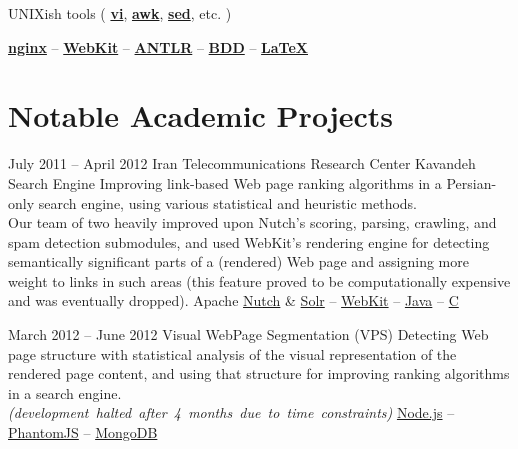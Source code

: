 \documentclass{tccv}
\newcommand{\plus}{\raisebox{.1\height}{\scalebox{.8}{+}}}
\begin{document}
{{\hspace{2pt}%
UNIXish tools (%
	\href{http://www.vim.org}{\bf vi}, %
	\href{http://awk.info}{\bf awk}, %
	\href{http://www.gnu.org/software/sed/}{\bf sed}, etc.%
)%

\hspace{2pt}%
	\href{http://nginx.org/en/}{\bf nginx} -- %
	\href{http://www.webkit.org}{\bf WebKit} -- %
	\href{http://www.antlr.org}{\bf ANTLR} -- %
	\href{http://en.wikipedia.org/wiki/Behavior-driven_development}{\bf BDD} -- %
	\href{http://www.latex-project.org}{\bf \LaTeX}




\newpage





\section{Notable Academic Projects}

\begin{project_list}

\item{July 2011 -- April 2012}
     {Iran Telecommunications Research Center}
     {Kavandeh Search Engine}
	 {Improving link-based Web page ranking algorithms in a Persian-only search engine, using various statistical and heuristic methods.
	 \\[1.5pt]
	 Our team of two heavily improved upon Nutch's \mbox{scoring}, parsing, crawling, and spam detection submodules, and used WebKit's rendering engine for detecting \mbox{semantically} significant parts of a (rendered) Web page and \mbox{assigning} more weight to links in such areas (this feature proved to be computationally expensive and was eventually dropped).}
     {%
     	Apache \href{http://nutch.apache.org}{Nutch} \&
		\href{http://lucene.apache.org/solr/}{Solr} -- %
		\href{http://www.webkit.org}{WebKit} -- %
		\href{http://www.oracle.com/technetwork/java/}{Java} -- %
		\href{https://en.wikipedia.org/wiki/C\%2B\%2B}{C\plus\plus}%
	}

\vspace{-6pt}

\item{March 2012 -- June 2012}
     {}
     {Visual WebPage Segmentation {\large (VPS)}}
	 {Detecting Web page structure with statistical \mbox{analysis} of the visual representation of the rendered page \mbox{content}, and using that structure for improving ranking algorithms in a search engine.\\[1.5pt]%
\mbox{\small\it(development halted after 4 months due to time constraints)}%
}
	 {%
	 	\href{http://nodejs.org}{Node.js} -- %
		\href{http://phantomjs.org}{PhantomJS} -- %
		\href{http://www.mongodb.org}{MongoDB}%
	 }


\end{project_list}}}
\end{document}
